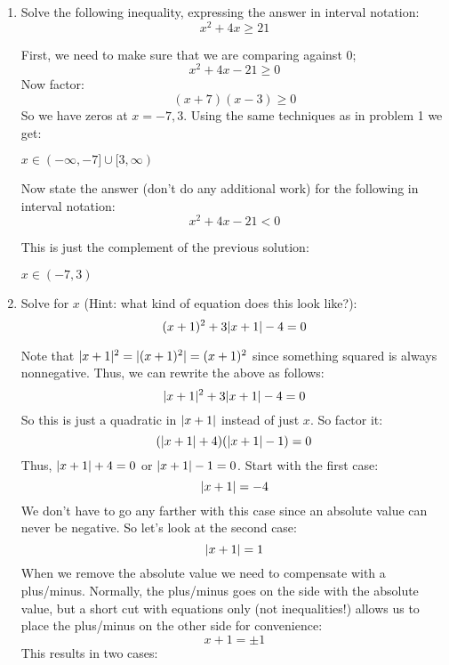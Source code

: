 \documentclass[letterpaper,12pt,fleqn]{article}
\begin{document}
\begin{enumerate}
\item Solve the following inequality, expressing the answer in interval
  notation:
  \[x^2+4x\ge 21\]

  First, we need to make sure that we are comparing against $0$;
  \[x^2+4x-21\ge0\]
  Now factor:
  \[(x+7)(x-3)\ge0\]
  So we have zeros at $x=-7,3$. Using the same techniques as in problem 1
  we get:

  \bigskip


  $x\in(-\infty,-7]\cup[3,\infty)$
  
  Now state the answer (don't do any additional work) for the following in
  interval notation:
  \[x^2+4x-21<0\]

  This is just the complement of the previous solution:


  $x\in(-7,3)$
  
\item Solve for $x$ (Hint: what kind of equation does this look like?):
  \[(x+1)^2+3\lvert x+1\rvert-4=0\]

  Note that $\lvert x+1\rvert^2=\lvert(x+1)^2\rvert=(x+1)^2$ since something squared is
  always nonnegative. Thus, we can rewrite the above as follows:
  \[\lvert x+1\rvert^2+3\lvert x+1\rvert-4=0\]
  So this is just a quadratic in $\lvert x+1\rvert$ instead of just $x$. So factor it:
  \[(\lvert x+1\rvert+4)(\lvert x+1\rvert-1)=0\]
  Thus, $\lvert x+1\rvert+4=0$ or $\lvert x+1\rvert-1=0$. Start with the first case:
  \[\lvert x+1\rvert=-4\]
  We don't have to go any farther with this case since an absolute value can
  never be negative. So let's look at the second case:
  \[\lvert x+1\rvert=1\]
  When we remove the absolute value we need to compensate with a plus/minus.
  Normally, the plus/minus goes on the side with the absolute value, but a
  short cut with equations only (not inequalities!) allows us to place the
  plus/minus on the other side for convenience:
  \[x+1=\pm1\]
  This results in two cases:


\end{enumerate}
\end{document}
